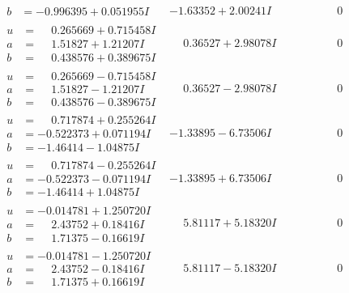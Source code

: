 \documentclass[1p]{elsarticle_modified}
\theoremstyle{definition}
\begin{document}
$$\begin{array}{c|c|c}
\begin{aligned}
b &= -0.996395 + 0.051955 I\end{aligned}
 & -1.63352 + 2.00241 I & \phantom{-0.000000 } 0 \\ \hline\begin{aligned}
u &= \phantom{-}0.265669 + 0.715458 I \\
a &= \phantom{-}1.51827 + 1.21207 I \\
b &= \phantom{-}0.438576 + 0.389675 I\end{aligned}
 & \phantom{-}0.36527 + 2.98078 I & \phantom{-0.000000 } 0 \\ \hline\begin{aligned}
u &= \phantom{-}0.265669 - 0.715458 I \\
a &= \phantom{-}1.51827 - 1.21207 I \\
b &= \phantom{-}0.438576 - 0.389675 I\end{aligned}
 & \phantom{-}0.36527 - 2.98078 I & \phantom{-0.000000 } 0 \\ \hline\begin{aligned}
u &= \phantom{-}0.717874 + 0.255264 I \\
a &= -0.522373 + 0.071194 I \\
b &= -1.46414 - 1.04875 I\end{aligned}
 & -1.33895 - 6.73506 I & \phantom{-0.000000 } 0 \\ \hline\begin{aligned}
u &= \phantom{-}0.717874 - 0.255264 I \\
a &= -0.522373 - 0.071194 I \\
b &= -1.46414 + 1.04875 I\end{aligned}
 & -1.33895 + 6.73506 I & \phantom{-0.000000 } 0 \\ \hline\begin{aligned}
u &= -0.014781 + 1.250720 I \\
a &= \phantom{-}2.43752 + 0.18416 I \\
b &= \phantom{-}1.71375 - 0.16619 I\end{aligned}
 & \phantom{-}5.81117 + 5.18320 I & \phantom{-0.000000 } 0 \\ \hline\begin{aligned}
u &= -0.014781 - 1.250720 I \\
a &= \phantom{-}2.43752 - 0.18416 I \\
b &= \phantom{-}1.71375 + 0.16619 I\end{aligned}
 & \phantom{-}5.81117 - 5.18320 I & \phantom{-0.000000 } 0 \\ \hline\begin{aligned}

\end{aligned}
\end{array}$$
\end{document}
